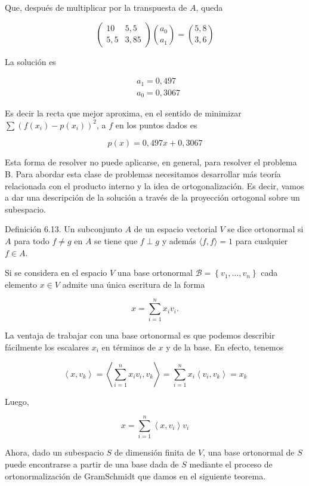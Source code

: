 \documentclass[10pt]{book}
\begin{document}
Que, después de multiplicar por la transpuesta de $A$, queda

$$
\left(\begin{array}{cc}
10 & 5,5 \\
5,5 & 3,85
\end{array}\right)\binom{a_{0}}{a_{1}}=\binom{5,8}{3,6}
$$

La solución es

$$
\begin{aligned}
& a_{1}=0,497 \\
& a_{0}=0,3067
\end{aligned}
$$

Es decir la recta que mejor aproxima, en el sentido de minimizar $\sum\left(f\left(x_{i}\right)-p\left(x_{i}\right)\right)^{2}$, a $f$ en los puntos dados es

$$
p(x)=0,497 x+0,3067
$$

Esta forma de resolver no puede aplicarse, en general, para resolver el problema B. Para abordar esta clase de problemas necesitamos desarrollar más teoría relacionada con el producto interno y la idea de ortogonalización. Es decir, vamos a dar una descripción de la solución a través de la proyección ortogonal sobre un subespacio.

Definición 6.13. Un subconjunto $A$ de un espacio vectorial $V$ se dice ortonormal si $A$ para todo $f \neq g$ en $A$ se tiene que $f \perp g$ y además $\langle f, f\rangle=1$ para cualquier $f \in A$.

Si se considera en el espacio $V$ una base ortonormal $\mathcal{B}=\left\{v_{1}, \ldots, v_{n}\right\}$ cada elemento $x \in V$ admite una única escritura de la forma

$$
x=\sum_{i=1}^{n} x_{i} v_{i} .
$$

La ventaja de trabajar con una base ortonormal es que podemos describir fácilmente los escalares $x_{i}$ en términos de $x$ y de la base. En efecto, tenemos

$$
\left\langle x, v_{k}\right\rangle=\left\langle\sum_{i=1}^{n} x_{i} v_{i}, v_{k}\right\rangle=\sum_{i=1}^{n} x_{i}\left\langle v_{i}, v_{k}\right\rangle=x_{k}
$$

Luego,

$$
x=\sum_{i=1}^{n}\left\langle x, v_{i}\right\rangle v_{i}
$$

Ahora, dado un subespacio $S$ de dimensión finita de $V$, una base ortonormal de $S$ puede encontrarse a partir de una base dada de $S$ mediante el proceso de ortonormalización de GramSchmidt que damos en el siguiente teorema.
\end{document}
